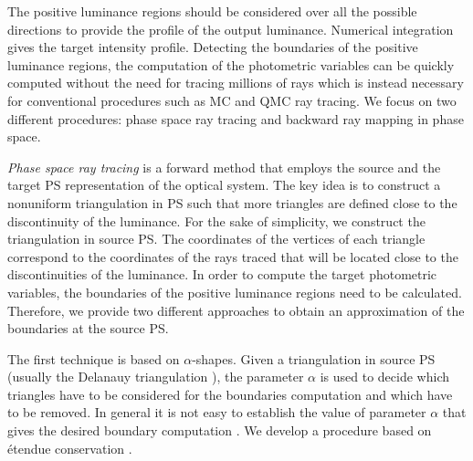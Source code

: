 The positive luminance regions should be considered over all the possible directions to provide the profile of the output luminance. 
Numerical integration gives the target intensity profile. Detecting the boundaries of the positive luminance regions, the computation of the photometric variables can be quickly computed without the need for tracing millions of rays which is instead necessary for conventional procedures such as MC and QMC ray tracing. We focus on two different procedures: phase space ray tracing and backward ray mapping in phase space.

\textit{Phase space ray tracing} is a forward method that employs the source and the target PS representation of the optical system. The key idea is to construct a nonuniform triangulation in PS such that more triangles are defined close to the discontinuity of the luminance. For the sake of simplicity, we construct the triangulation in source PS. The coordinates of the vertices of each triangle correspond to the coordinates of the rays traced that will be located close to the discontinuities of the luminance. In order to compute the target photometric variables, the boundaries of the positive luminance regions need to be calculated. 
Therefore, we provide two different approaches to obtain an approximation of the boundaries at the source PS.

The first technique is based on $\alpha$-shapes. 
Given a triangulation in source PS (usually the Delanauy triangulation \cite{marsden2003texts}), the parameter $\alpha$ is used to decide which triangles have to be considered for the boundaries computation and which have to be removed. In general it is not easy to establish the value of parameter $\alpha$ that gives the desired boundary computation \cite{teichmann1998surface}. We develop a procedure based on \'{e}tendue conservation \cite{filosa2015new}. 

